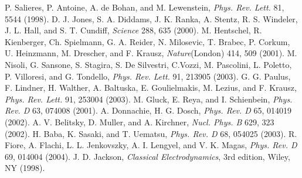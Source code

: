 \documentclass[prd,showpacs,twocolumn]{revtex4-1}
\begin{document}
\begin{thebibliography}{}
\label{sec:TeXbooks}
 P. Salieres, P. Antoine, A. de Bohan, and M. Lewenstein, \emph{Phys. Rev. Lett.} 81, 5544 (1998).
 D. J. Jones, S. A. Diddams, J. K. Ranka, A. Stentz, R. S. Windeler, J. L. Hall, and S. T. Cundiff, \emph{Science} 288, 635 (2000).
 M. Hentschel, R. Kienberger, Ch. Spielmann, G. A. Reider, N. Milosevic, T. Brabec, P. Corkum, U. Heinzmann, M. Drescher, and F. Krausz, \emph{Nature}(London) 414, 509 (2001).
 M. Nisoli, G. Sansone, S. Stagira, S. De Silvestri, C.Vozzi, M. Pascolini, L. Poletto, P. Villoresi, and G. Tondello, \emph{Phys. Rev. Lett.} 91, 213905 (2003).
 G. G. Paulus, F. Lindner, H. Walther, A. Baltuska, E. Goulielmakis, M. Lezius, and F. Krausz, \emph{Phys. Rev. Lett.} 91, 253004 (2003).
 M. Gluck, E. Reya, and I. Schienbein, \emph{Phys. Rev. D} 63, 074008 (2001).
 A. Donnachie, H. G. Dosch, \emph{Phys. Rev. D} 65, 014019 (2002).
 A. V. Belitsky, D. Muller, and A. Kirchner, \emph{Nucl. Phys. B} 629, 323 (2002).
 H. Baba, K. Sasaki, and T. Uematsu, \emph{Phys. Rev. D} 68, 054025 (2003).
 R. Fiore, A. Flachi, L. L. Jenkovszky, A. I. Lengyel, and V. K. Magas, \emph{Phys. Rev. D} 69, 014004 (2004).
 J. D. Jackson, \emph{Classical Electrodynamics}, 3rd edition, Wiley, NY (1998).
\end{thebibliography}
\end{document}
